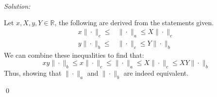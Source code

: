 \documentclass[12pt]{article}
\newenvironment{problem}[2][Problem]{\begin{trivlist}
\item[\hskip \labelsep {\bfseries #1}\hskip \labelsep {\bfseries #2.}]}{\end{trivlist}}
\newenvironment{sol}
    {\emph{Solution:}
    }
    {
    \qed
    }
\newcommand{\R}{\mathbb{R}}
\begin{document}
\newpage
\begin{problem}{2}
    
\end{problem}
\begin{sol}
    Let $x, X, y, Y \in \R$, the following are derived from the statements given.
    \begin{align*}
        x \| \cdot \|_c \leq &\| \cdot \|_a \leq X \| \cdot \|_c\\
        y \| \cdot \|_b \leq &\| \cdot \|_c \leq Y \| \cdot \|_b
    \end{align*}
    We can combine these inequalities to find that:
    \[
    xy \| \cdot \|_b \leq x \| \cdot \|_c \leq \| \cdot \|_a \leq X \| \cdot \|_c \leq  XY \|\cdot\|_b
    \]
    Thus, showing that  $\| \cdot \|_a$ and $\| \cdot \|_b$ are indeed equivalent. 
\end{sol}
\newpage
\begin{problem}{3}
    
\end{problem}
\end{document}
